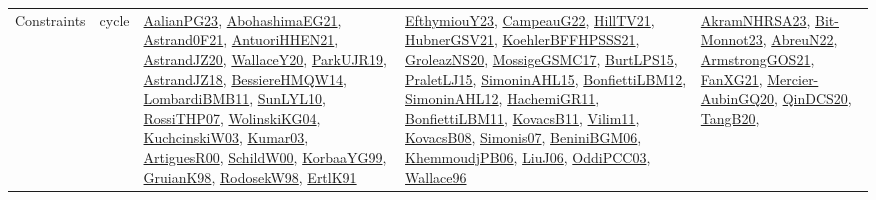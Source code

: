 {\begin{longtable}{lp{3cm}>{\raggedright}p{6cm}>{\raggedright}p{6cm}p{8cm}}
Constraints & cycle & \href{papers/AalianPG23.pdf}{AalianPG23}\cite{AalianPG23}, \href{articles/AbohashimaEG21.pdf}{AbohashimaEG21}\cite{AbohashimaEG21}, \href{papers/Astrand0F21.pdf}{Astrand0F21}\cite{Astrand0F21}, \href{papers/AntuoriHHEN21.pdf}{AntuoriHHEN21}\cite{AntuoriHHEN21}, \href{articles/AstrandJZ20.pdf}{AstrandJZ20}\cite{AstrandJZ20}, \href{articles/WallaceY20.pdf}{WallaceY20}\cite{WallaceY20}, \href{papers/ParkUJR19.pdf}{ParkUJR19}\cite{ParkUJR19}, \href{papers/AstrandJZ18.pdf}{AstrandJZ18}\cite{AstrandJZ18}, \href{papers/BessiereHMQW14.pdf}{BessiereHMQW14}\cite{BessiereHMQW14}, \href{papers/LombardiBMB11.pdf}{LombardiBMB11}\cite{LombardiBMB11}, \href{papers/SunLYL10.pdf}{SunLYL10}\cite{SunLYL10}, \href{papers/RossiTHP07.pdf}{RossiTHP07}\cite{RossiTHP07}, \href{papers/WolinskiKG04.pdf}{WolinskiKG04}\cite{WolinskiKG04}, \href{articles/KuchcinskiW03.pdf}{KuchcinskiW03}\cite{KuchcinskiW03}, \href{papers/Kumar03.pdf}{Kumar03}\cite{Kumar03}, \href{articles/ArtiguesR00.pdf}{ArtiguesR00}\cite{ArtiguesR00}, \href{articles/SchildW00.pdf}{SchildW00}\cite{SchildW00}, \href{papers/KorbaaYG99.pdf}{KorbaaYG99}\cite{KorbaaYG99}, \href{papers/GruianK98.pdf}{GruianK98}\cite{GruianK98}, \href{papers/RodosekW98.pdf}{RodosekW98}\cite{RodosekW98}, \href{papers/ErtlK91.pdf}{ErtlK91}\cite{ErtlK91} & \href{papers/EfthymiouY23.pdf}{EfthymiouY23}\cite{EfthymiouY23}, \href{articles/CampeauG22.pdf}{CampeauG22}\cite{CampeauG22}, \href{papers/HillTV21.pdf}{HillTV21}\cite{HillTV21}, \href{articles/HubnerGSV21.pdf}{HubnerGSV21}\cite{HubnerGSV21}, \href{articles/KoehlerBFFHPSSS21.pdf}{KoehlerBFFHPSSS21}\cite{KoehlerBFFHPSSS21}, \href{papers/GroleazNS20.pdf}{GroleazNS20}\cite{GroleazNS20}, \href{papers/MossigeGSMC17.pdf}{MossigeGSMC17}\cite{MossigeGSMC17}, \href{papers/BurtLPS15.pdf}{BurtLPS15}\cite{BurtLPS15}, \href{papers/PraletLJ15.pdf}{PraletLJ15}\cite{PraletLJ15}, \href{articles/SimoninAHL15.pdf}{SimoninAHL15}\cite{SimoninAHL15}, \href{papers/BonfiettiLBM12.pdf}{BonfiettiLBM12}\cite{BonfiettiLBM12}, \href{papers/SimoninAHL12.pdf}{SimoninAHL12}\cite{SimoninAHL12}, \href{articles/HachemiGR11.pdf}{HachemiGR11}\cite{HachemiGR11}, \href{papers/BonfiettiLBM11.pdf}{BonfiettiLBM11}\cite{BonfiettiLBM11}, \href{articles/KovacsB11.pdf}{KovacsB11}\cite{KovacsB11}, \href{papers/Vilim11.pdf}{Vilim11}\cite{Vilim11}, \href{articles/KovacsB08.pdf}{KovacsB08}\cite{KovacsB08}, \href{articles/Simonis07.pdf}{Simonis07}\cite{Simonis07}, \href{papers/BeniniBGM06.pdf}{BeniniBGM06}\cite{BeniniBGM06}, \href{papers/KhemmoudjPB06.pdf}{KhemmoudjPB06}\cite{KhemmoudjPB06}, \href{papers/LiuJ06.pdf}{LiuJ06}\cite{LiuJ06}, \href{papers/OddiPCC03.pdf}{OddiPCC03}\cite{OddiPCC03}, \href{articles/Wallace96.pdf}{Wallace96}\cite{Wallace96} & \href{articles/AkramNHRSA23.pdf}{AkramNHRSA23}\cite{AkramNHRSA23}, \href{papers/Bit-Monnot23.pdf}{Bit-Monnot23}\cite{Bit-Monnot23}, \href{articles/AbreuN22.pdf}{AbreuN22}\cite{AbreuN22}, \href{papers/ArmstrongGOS21.pdf}{ArmstrongGOS21}\cite{ArmstrongGOS21}, \href{articles/FanXG21.pdf}{FanXG21}\cite{FanXG21}, \href{papers/Mercier-AubinGQ20.pdf}{Mercier-AubinGQ20}\cite{Mercier-AubinGQ20}, \href{articles/QinDCS20.pdf}{QinDCS20}\cite{QinDCS20}, \href{papers/TangB20.pdf}{TangB20}\cite{TangB20}, 
\end{longtable}}
